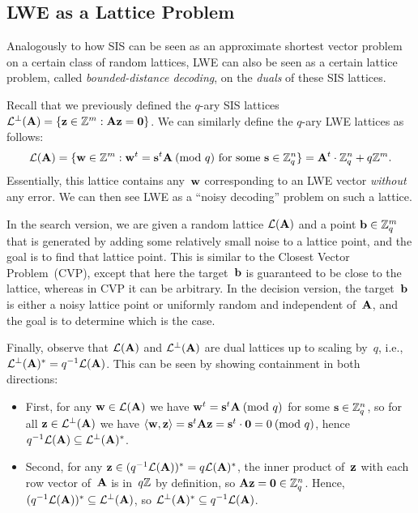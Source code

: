 \documentclass[11pt]{article}
\begin{document}
\subsection{LWE as a Lattice Problem}
\label{sec:lwe-as-lattice}

Analogously to how SIS can be seen as an approximate shortest vector
problem on a certain class of random lattices, LWE can also be seen as
a certain lattice problem, called \emph{bounded-distance decoding}, on
the \emph{duals} of these SIS lattices.

Recall that we previously defined the $q$-ary SIS lattices
$\mathcal{L}^{\perp}(\mathbf{A}) = \{\mathbf{z} \in \mathbb{Z}^{m}: \mathbf{A}\mathbf{z} = \mathbf{0}\}$. We
can similarly define the $q$-ary LWE lattices as follows:
\[\lat(\matA) = \set{\vecw \in \Z^m : \vecw^t = \vecs^t\matA \pmod*{q}
    \text{ for some $\vecs \in \Zq^{n}$} } = \matA^{t} \cdot \Zq^{n} +
  q\Z^{m}. \] Essentially, this lattice contains any~$\mathbf{w}$
corresponding to an LWE vector \emph{without} any error. We can then
see LWE as a ``noisy decoding'' problem on such a lattice.

In the search version, we are given a random lattice $\mathcal{L}(\mathbf{A})$ and
a point $\mathbf{b} \in \mathbb{Z}_q^{m}$ that is generated by adding some
relatively small noise to a lattice point, and the goal is to find
that lattice point. This is similar to the Closest Vector
Problem~(CVP), except that here the target~$\mathbf{b}$ is guaranteed to be
close to the lattice, whereas in CVP it can be arbitrary. In the
decision version, the target~$\mathbf{b}$ is either a noisy lattice point
or uniformly random and independent of~$\mathbf{A}$, and the goal is to
determine which is the case.

Finally, observe that $\mathcal{L}(\mathbf{A})$ and $\mathcal{L}^{\perp}(\mathbf{A})$ are dual
lattices up to scaling by~$q$, i.e.,
$\mathcal{L}^{\perp}(\mathbf{A})^{*} = q^{-1} \mathcal{L}(\mathbf{A})$. This can be seen by
showing containment in both directions:
\begin{itemize}
\item First, for any $\mathbf{w} \in \mathcal{L}(\mathbf{A})$ we have
  $\vecw^{t} = \vecs^{t} \matA \pmod*{q}$ for some
  $\mathbf{s} \in \mathbb{Z}_q^{n}$, so for all $\mathbf{z} \in \mathcal{L}^{\perp}(\mathbf{A})$ we have
  $\inner{\vecw, \vecz} = \vecs^{t} \matA \vecz = \vecs^{t} \cdot
  \veczero = 0 \pmod*{q}$, hence
  $q^{-1} \mathcal{L}(\mathbf{A}) \subseteq \mathcal{L}^{\perp}(\mathbf{A})^{*}$.
\item Second, for any
  $\mathbf{z} \in (q^{-1} \mathcal{L}(\mathbf{A}))^{*} = q \mathcal{L}(\mathbf{A})^{*}$, the inner
  product of~$\mathbf{z}$ with each row vector of~$\mathbf{A}$ is in~$q\mathbb{Z}$ by
  definition, so $\mathbf{A} \mathbf{z} = \mathbf{0} \in \mathbb{Z}_q^{n}$. Hence,
  $(q^{-1} \mathcal{L}(\mathbf{A}))^{*} \subseteq \mathcal{L}^{\perp}(\mathbf{A})$, so
  $\mathcal{L}^{\perp}(\mathbf{A})^{*} \subseteq q^{-1} \mathcal{L}(\mathbf{A})$.
\end{itemize}
\end{document}
